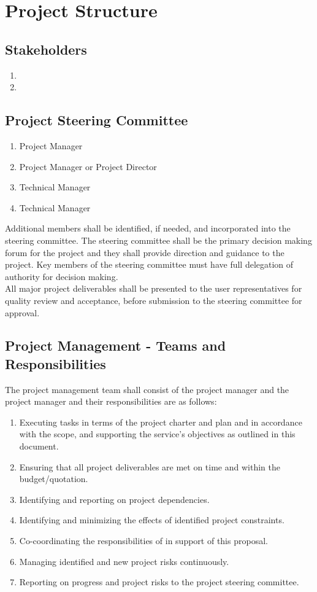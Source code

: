 \clearpage
\section{Project Structure}
\subsection{Stakeholders}
\begin{enumerate}
	\item \client
	\item \vendor
\end{enumerate}
\subsection{Project Steering Committee}
\begin{enumerate}
	\item \client Project Manager
	\item \vendor Project Manager or Project Director
	\item \client Technical Manager
	\item \vendor Technical Manager
\end{enumerate}
Additional members shall be identified, if needed, and incorporated into the steering committee. The steering committee shall be the primary decision making forum for the project and they shall provide direction and guidance to the project. Key members of the steering committee must have full delegation of authority for decision making.
\\
All major project deliverables shall be presented to the user representatives for quality review and acceptance, before submission to the steering committee for approval. 
\subsection{Project Management - Teams and Responsibilities}
The project management team shall consist of the \vendor project manager and the \client project manager and their responsibilities are as follows:
\begin{enumerate} 
\item Executing tasks in terms of the project charter and plan and in accordance with the scope, and supporting the service's objectives as outlined in this document.
\item Ensuring that all project deliverables are met on time and within the budget/quotation.
\item Identifying and reporting on project dependencies.
\item Identifying and minimizing the effects of identified project constraints.
\item Co-coordinating the responsibilities of \client in support of this proposal.
\item Managing identified and new project	 risks continuously.
\item Reporting on progress and project risks to the project steering committee.
\end{enumerate}
